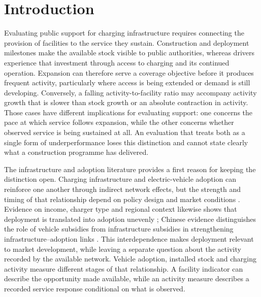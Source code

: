 \section{Introduction}
Evaluating public support for charging infrastructure requires connecting the provision of facilities to the service they sustain. Construction and deployment milestones make the available stock visible to public authorities, whereas drivers experience that investment through access to charging and its continued operation. Expansion can therefore serve a coverage objective before it produces frequent activity, particularly where access is being extended or demand is still developing. Conversely, a falling activity-to-facility ratio may accompany activity growth that is slower than stock growth or an absolute contraction in activity. Those cases have different implications for evaluating support: one concerns the pace at which service follows expansion, while the other concerns whether observed service is being sustained at all. An evaluation that treats both as a single form of underperformance loses this distinction and cannot state clearly what a construction programme has delivered.

The infrastructure and adoption literature provides a first reason for keeping the distinction open. Charging infrastructure and electric-vehicle adoption can reinforce one another through indirect network effects, but the strength and timing of that relationship depend on policy design and market conditions \citep{li2017,springel2021,burra2024}. Evidence on income, charger type and regional context likewise shows that deployment is translated into adoption unevenly \citep{gifford2026,gabehart2026}; Chinese evidence distinguishes the role of vehicle subsidies from infrastructure subsidies in strengthening infrastructure--adoption links \citep{hu2025_charging}. This interdependence makes deployment relevant to market development, while leaving a separate question about the activity recorded by the available network. Vehicle adoption, installed stock and charging activity measure different stages of that relationship. A facility indicator can describe the opportunity made available, while an activity measure describes a recorded service response conditional on what is observed.

